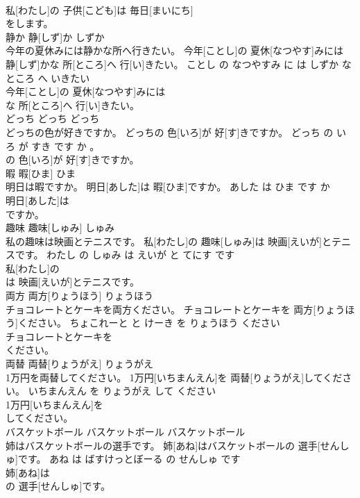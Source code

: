 \documentclass[8pt]{extreport}
\begin{document}
\begin{CJK}{UTF8}{min}
\\	私[わたし]の 子供[こども]は 毎日[まいにち]
\\	をします。			
\\	静か	静[しず]か	しずか	
\\	今年の夏休みには静かな所へ行きたい。	今年[ことし]の 夏休[なつやす]みには 静[しず]かな 所[ところ]へ 行[い]きたい。	ことし の なつやすみ に は しずか な ところ へ いきたい	
\\	今年[ことし]の 夏休[なつやす]みには
\\	な 所[ところ]へ 行[い]きたい。			
\\	どっち	どっち	どっち	
\\	どっちの色が好きですか。	どっちの 色[いろ]が 好[す]きですか。	どっち の いろ が すき です か 。	
\\	の 色[いろ]が 好[す]きですか。			
\\	暇	暇[ひま]	ひま	
\\	明日は暇ですか。	明日[あした]は 暇[ひま]ですか。	あした は ひま です か	
\\	明日[あした]は
\\	ですか。			
\\	趣味	趣味[しゅみ]	しゅみ	
\\	私の趣味は映画とテニスです。	私[わたし]の 趣味[しゅみ]は 映画[えいが]とテニスです。	わたし の しゅみ は えいが と てにす です	
\\	私[わたし]の
\\	は 映画[えいが]とテニスです。			
\\	両方	両方[りょうほう]	りょうほう	
\\	チョコレートとケーキを両方ください。	チョコレートとケーキを 両方[りょうほう]ください。	ちょこれーと と けーき を りょうほう ください	
\\	チョコレートとケーキを
\\	ください。			
\\	両替	両替[りょうがえ]	りょうがえ	
\\	1万円を両替してください。	1万円[いちまんえん]を 両替[りょうがえ]してください。	いちまんえん を りょうがえ して ください	
\\	1万円[いちまんえん]を
\\	してください。			
\\	バスケットボール	バスケットボール	バスケットボール	
\\	姉はバスケットボールの選手です。	姉[あね]はバスケットボールの 選手[せんしゅ]です。	あね は ばすけっとぼーる の せんしゅ です	
\\	姉[あね]は
\\	の 選手[せんしゅ]です。			

\end{CJK}
\end{document}

